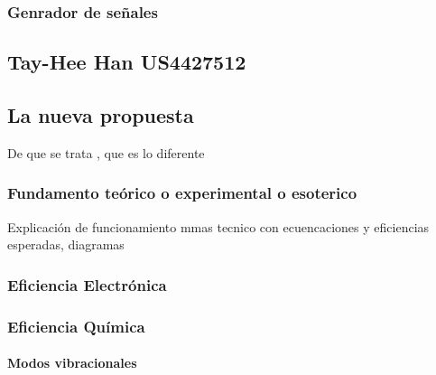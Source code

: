 \documentclass[12pt,twoside,onecolumn]{article}
\begin{document}
\subsubsection{Genrador de señales}

\subsection{Tay-Hee Han US4427512~\cite{han1984water}}









\subsection{La nueva propuesta}

De que se trata , que es lo diferente

\subsubsection{Fundamento teórico o experimental o esoterico}
Explicación de funcionamiento
mmas tecnico con ecuencaciones y eficiencias esperadas, diagramas

\subsubsection{Eficiencia Electrónica}
\subsubsection{Eficiencia Química}

\paragraph{Modos vibracionales}
\end{document}
